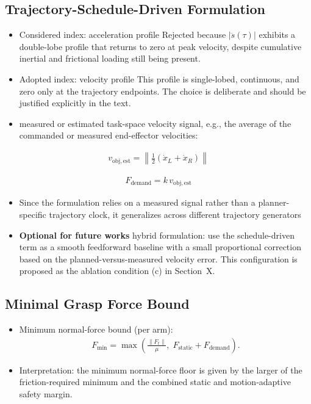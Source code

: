 \documentclass[conference]{IEEEtran}
\begin{document}
\subsection*{Trajectory-Schedule-Driven Formulation}
\begin{itemize}

    \item Considered index: acceleration profile Rejected because \(|\ddot{s}(\tau)|\) exhibits a double-lobe profile that returns to zero at peak velocity, despite cumulative inertial and frictional loading still being present.

    \item Adopted index: velocity profile This profile is single-lobed, continuous, and zero only at the trajectory endpoints. The choice is deliberate and should be justified explicitly in the text.

    \item measured or estimated task-space velocity signal, e.g., the average of the commanded or measured end-effector velocities:
\end{itemize}    
    \begin{align}
        v_{\mathrm{obj,est}}=\left\|\frac{1}{2}\left(\dot{x}_{L} + \dot{x}_{R}\right)\right\|
    \end{align}

    \begin{align}
        F_{\mathrm{demand}}=k\,v_{\mathrm{obj,est}}
    \end{align}
\begin{itemize}
    \item Since the formulation relies on a measured signal rather than a planner-specific trajectory clock, it generalizes across different trajectory generators
    \item \textbf{Optional for future works} hybrid formulation: use the schedule-driven term as a smooth feedforward baseline with a small proportional correction based on the planned-versus-measured velocity error. This configuration is proposed as the ablation condition (c) in Section~X.
\end{itemize}

\subsection*{Minimal Grasp Force Bound}
\begin{itemize}
    \item Minimum normal-force bound (per arm):
    \begin{align}
        F_{\mathrm{min}}
        =
        \max\left(
        \frac{\lVert F_t \rVert}{\mu},
        \;
        F_{\mathrm{static}} + F_{\mathrm{demand}}
        \right).
    \end{align}

    \item Interpretation: the minimum normal-force floor is given by the larger of the friction-required minimum and the combined static and motion-adaptive safety margin.
\end{itemize}
\end{document}
